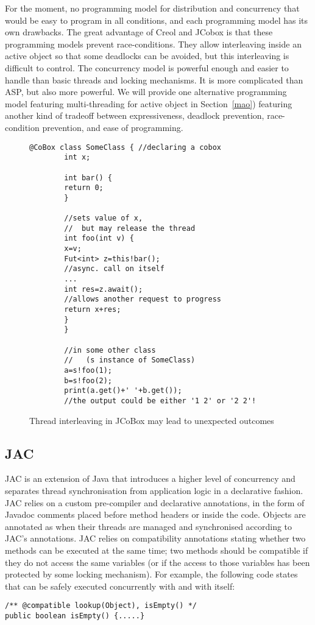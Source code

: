 \smallskip

For the moment, no programming model for distribution
and concurrency that would be easy to program in all conditions, and
each programming model has its own drawbacks. The great advantage of Creol and JCobox
is that these programming models prevent race-conditions. They allow
interleaving inside an active object so that some deadlocks
can be avoided, but this interleaving is difficult to control. The concurrency model is powerful enough and easier to
handle than basic threads and locking mechanisms. It is more
complicated than ASP, but also more powerful.
We will provide one
alternative programming model featuring multi-threading for active
object in Section~\ref{mao}) featuring another kind of tradeoff
between expressiveness, deadlock prevention, race-condition
prevention, and ease of programming. 



\begin{figure}[t]
	\begin{small}
		\begin{lstlisting}[frame=single]
		@CoBox class SomeClass { //declaring a cobox
		int x;
		
		int bar() {
		return 0;
		}
		
		//sets value of x, 
		//  but may release the thread 
		int foo(int v) {
		x=v;
		Fut<int> z=this!bar();  
		//async. call on itself
		...
		int res=z.await(); 
		//allows another request to progress
		return x+res; 
		}
		}
		
		//in some other class 
		//   (s instance of SomeClass)
		a=s!foo(1);
		b=s!foo(2);
		print(a.get()+' '+b.get());
		//the output could be either '1 2' or '2 2'!
		\end{lstlisting}
	\end{small}
	\caption{Thread interleaving  in JCoBox may lead to unexpected outcomes}
	\label{jcobox_await_problem}
\end{figure}

\subsection{JAC}

JAC \cite{lohr2006jac}  is an extension of Java that introduces a
higher level of concurrency and separates thread synchronisation from
application logic in a declarative fashion. JAC relies on a custom
pre-compiler and declarative annotations, in the form of Javadoc
comments placed before method headers or inside the code. Objects are
annotated as  when their threads are managed and
synchronised according to JAC's annotations. JAC relies on
compatibility annotations stating whether two methods can be executed
at the same time; two methods should be compatible if they do not
access the same variables (or if the access to those variables has
been protected by some locking mechanism).  For example, the following
code states that  can be safely executed concurrently
with  and with itself:
\begin{lstlisting}
/** @compatible lookup(Object), isEmpty() */
public boolean isEmpty() {.....}
\end{lstlisting} 

